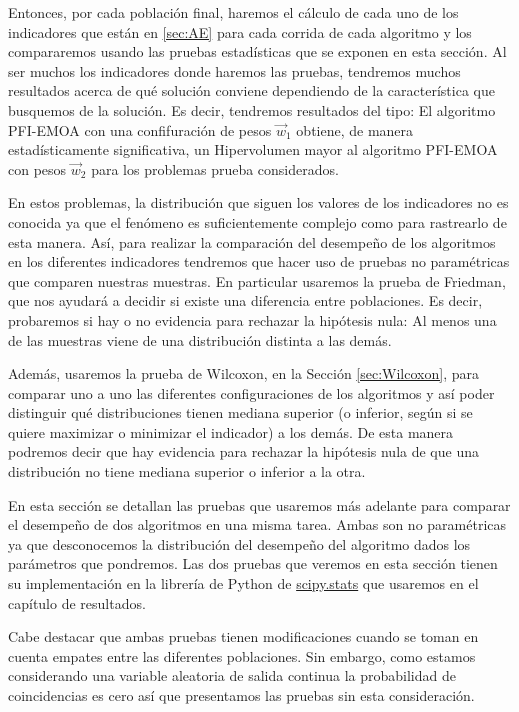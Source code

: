 Entonces, por cada población final, haremos el cálculo de cada uno de los indicadores que están en \ref{sec:AE} para cada corrida de cada algoritmo y los compararemos usando las pruebas estadísticas que se exponen en esta sección. Al ser muchos los indicadores donde haremos las pruebas, tendremos muchos resultados acerca de qué solución conviene dependiendo de la característica que busquemos de la solución. Es decir, tendremos resultados del tipo: El algoritmo PFI-EMOA con una confifuración de pesos $\vec{w}_1$ obtiene, de manera estadísticamente significativa, un Hipervolumen mayor al algoritmo PFI-EMOA con pesos $\vec{w}_2$ para los problemas prueba considerados.   

En estos problemas, la distribución que siguen los valores de los indicadores no es conocida ya que el fenómeno es suficientemente complejo como para rastrearlo de esta manera. Así, para realizar la comparación del desempeño de los algoritmos en los diferentes indicadores tendremos que hacer uso de pruebas no paramétricas que comparen nuestras muestras. En particular usaremos la prueba de Friedman, que nos ayudará a decidir si existe una diferencia entre poblaciones. Es decir, probaremos si hay o no evidencia para rechazar la hipótesis nula: Al menos una de las muestras viene de una distribución distinta a las demás. 

Además, usaremos la prueba de Wilcoxon, en la Sección \ref{sec:Wilcoxon}, para comparar uno a uno las diferentes configuraciones de los algoritmos y así poder distinguir qué distribuciones tienen mediana superior (o inferior, según si se quiere maximizar o minimizar el indicador) a los demás. De esta manera podremos decir que hay evidencia para rechazar la hipótesis nula de que una distribución no tiene mediana superior o inferior a la otra.

En esta sección se detallan las pruebas que usaremos más adelante para comparar el desempeño de dos algoritmos en una misma tarea. Ambas son no paramétricas ya que desconocemos la distribución del desempeño del algoritmo dados los parámetros que pondremos. Las dos pruebas que veremos en esta sección tienen su implementación en la librería de Python de  \href{https://docs.scipy.org/doc/scipy/reference/stats.html}{scipy.stats} que usaremos en el capítulo de resultados. 

Cabe destacar que ambas pruebas tienen modificaciones cuando se toman en cuenta empates entre las diferentes poblaciones. Sin embargo, como estamos considerando una variable aleatoria de salida continua la probabilidad de coincidencias es cero así que presentamos las pruebas sin esta consideración.


